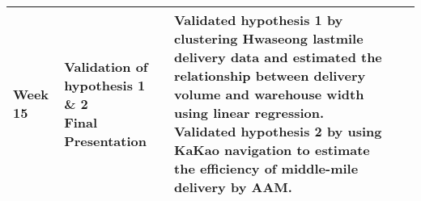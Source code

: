 \begin{longtable}[c]{@{}lllll@{}}
    Week 15 & \parbox[t]{6cm}{\raggedright Validation of hypothesis 1 \& 2 \\ Final Presentation}& \parbox[t]{6cm}{\raggedright Validated hypothesis 1 by clustering Hwaseong lastmile delivery data and estimated the relationship between delivery volume and warehouse width using linear regression. \\
    Validated hypothesis 2 by using KaKao navigation to estimate the efficiency of middle-mile delivery by AAM.\\} \\* \bottomrule
\end{longtable}
